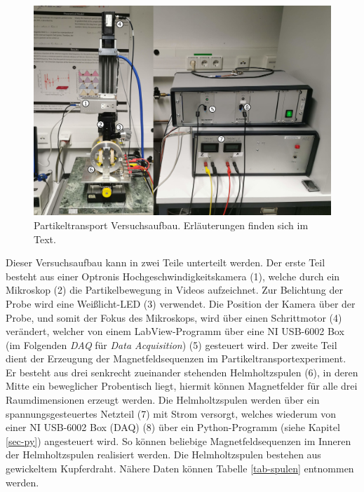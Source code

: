 \documentclass[page,pdftex,12pt,a4paper,twoside,openright]{scrbook}
\begin{document}
\begin{figure}[htbp]
\centering
\includegraphics[width=\textwidth]{./img/aufbau.png}
\caption{\label{img-aufbau}
Partikeltransport Versuchsaufbau. Erläuterungen finden sich im Text.}
\end{figure}

Dieser Versuchsaufbau kann in zwei Teile unterteilt werden. Der erste Teil besteht aus einer Optronis Hochgeschwindigkeitskamera (1), welche durch ein Mikroskop (2) die Partikelbewegung in Videos aufzeichnet. Zur Belichtung der Probe wird eine Weißlicht-LED (3) verwendet. Die Position der Kamera über der Probe, und somit der Fokus des Mikroskops, wird über einen Schrittmotor (4) verändert, welcher von einem LabView-Programm über eine NI USB-6002 Box (im Folgenden \emph{DAQ} für \emph{Data Acquisition}) (5) gesteuert wird. Der zweite Teil dient der Erzeugung der Magnetfeldsequenzen im Partikeltransportexperiment. Er besteht aus drei senkrecht zueinander stehenden Helmholtzspulen (6), in deren Mitte ein beweglicher Probentisch liegt, hiermit können Magnetfelder für alle drei Raumdimensionen erzeugt werden. Die Helmholtzspulen werden über ein spannungsgesteuertes Netzteil (7) mit Strom versorgt, welches wiederum von einer NI USB-6002 Box (DAQ) (8) über ein Python-Programm (siehe Kapitel \ref{sec-py}) angesteuert wird. So können beliebige Magnetfeldsequenzen im Inneren der Helmholtzspulen realisiert werden. Die Helmholtzspulen bestehen aus gewickeltem Kupferdraht. Nähere Daten können Tabelle \ref{tab-spulen} entnommen werden.\\
\end{document}
